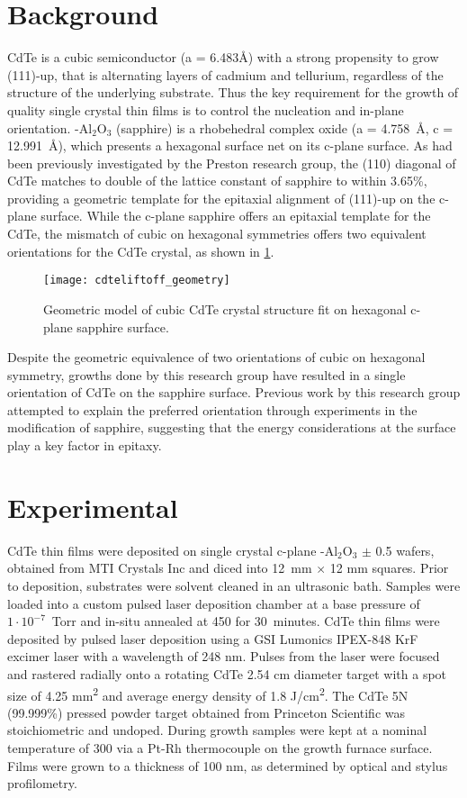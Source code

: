 \section{Background}
CdTe is a cubic semiconductor (a = 6.483\AA{}) with a strong propensity to grow (111)-up, that is alternating layers of cadmium and tellurium, regardless of the structure of the underlying substrate.
Thus the key requirement for the growth of quality single crystal thin films is to control the nucleation and in-plane orientation. \textalpha-Al\(_2\)O\(_3\) (sapphire) is a rhobehedral complex oxide (a = 4.758~\AA{}, c = 12.991~\AA{}), which presents a hexagonal surface net on its c-plane surface.
As had been previously investigated by the Preston research group, the (110) diagonal of CdTe matches to double of the lattice constant of sapphire to within 3.65\%, providing a geometric template for the epitaxial alignment of (111)-up on the 
c-plane surface.
While the c-plane sapphire offers an epitaxial template for the CdTe, the mismatch of cubic on hexagonal symmetries offers two equivalent orientations for the CdTe crystal, as shown in \cref{fig:cdteliftoff_geometry}.
\begin{figure}
 \centering \texttt{[image: cdteliftoff\_geometry]}
 \caption{\label{fig:cdteliftoff_geometry}Geometric model of cubic CdTe crystal structure fit on hexagonal c-plane sapphire surface.}
\end{figure}
Despite the geometric equivalence of two orientations of cubic on hexagonal symmetry, growths done by this research group have resulted in a single orientation of CdTe on the sapphire surface.
Previous work by this research group attempted to explain the preferred orientation through experiments in the modification of sapphire\cite{Neretina2009b}, suggesting that the energy considerations at the surface play a key factor in epitaxy.
\section{Experimental}
CdTe thin films were deposited on single crystal c-plane \textalpha-Al\(_2\)O\(_3\) \(\pm\) 0.5\degree{} wafers, obtained from MTI Crystals Inc and diced into 12~mm \(\times\) 12 mm squares.
Prior to deposition, substrates were solvent cleaned in an ultrasonic bath.
Samples were loaded into a custom pulsed laser deposition chamber at a base pressure of \(1\cdot10^{-7}\)~Torr and in-situ annealed at 450\celsius{} for 30~minutes.
CdTe thin films were deposited by pulsed laser deposition using a GSI Lumonics IPEX-848 KrF excimer laser with a wavelength of 248 nm.
Pulses from the laser were focused and rastered radially onto a rotating CdTe 2.54 cm diameter target with a spot size of 4.25 mm\textsuperscript{2} and average energy density of 1.8 J/cm\textsuperscript{2}.
The CdTe 5N (99.999\%) pressed powder 
target obtained from Princeton Scientific was stoichiometric and undoped.
During growth samples were kept at a nominal temperature of 300\celsius{} via a Pt-Rh thermocouple on the growth furnace surface.
Films were grown to a thickness of 100 nm, as determined by optical and stylus profilometry.

